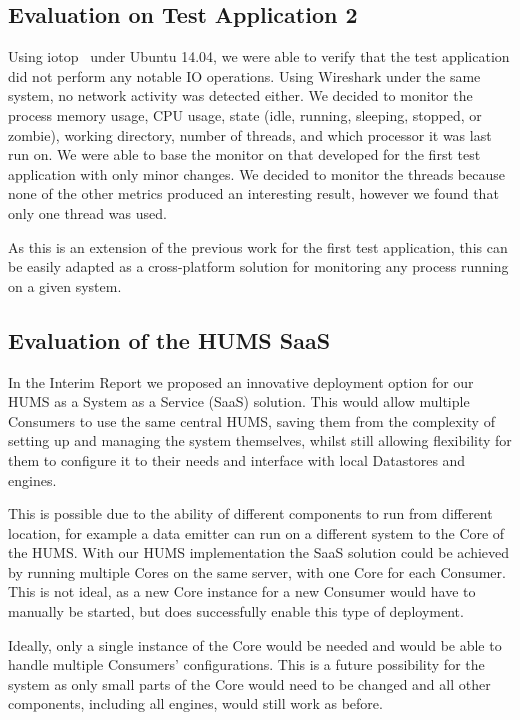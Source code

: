 \documentclass[10pt,a4paper]{article}
\begin{document}
\subsection{Evaluation on Test Application 2}
\label{sec:test_app2}

Using iotop~\cite{iotop} under Ubuntu 14.04, we were able to verify that the test application did not perform any notable IO operations. Using Wireshark under the same system, no network activity was detected either.
We decided to monitor the process memory usage, CPU usage, state (idle, running, sleeping, stopped, or zombie), working directory, number of threads, and which processor it was last run on. We were able to base the monitor on that developed for the first test application with only minor changes. We decided to monitor the threads because none of the other metrics produced an interesting result, however we found that only one thread was used.

As this is an extension of the previous work for the first test application, this can be easily adapted as a cross-platform solution for monitoring any process running on a given system. 

\subsection{Evaluation of the HUMS SaaS}
\label{sec:hums_saas}

In the Interim Report we proposed an innovative deployment option for our HUMS as a System as a Service (SaaS) solution. This would allow multiple Consumers to use the same central HUMS, saving them from the complexity of setting up and managing the system themselves, whilst still allowing flexibility for them to configure it to their needs and interface with local Datastores and engines.

This is possible due to the ability of different components to run from different location, for example a data emitter can run on a different system to the Core of the HUMS. With our HUMS implementation the SaaS solution could be achieved by running multiple Cores on the same server, with one Core for each Consumer. This is not ideal, as a new Core instance for a new Consumer would have to manually be started, but does successfully enable this type of deployment.

Ideally, only a single instance of the Core would be needed and would be able to handle multiple Consumers' configurations. This is a future possibility for the system as only small parts of the Core would need to be changed and all other components, including all engines, would still work as before.
\end{document}
